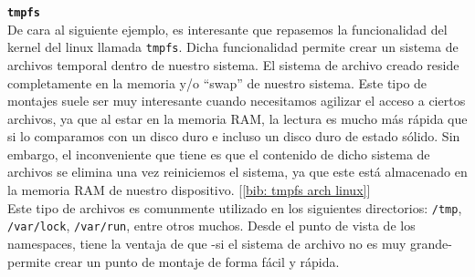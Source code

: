\documentclass[a4paper, oneside, 12pt]{book}
\begin{document}


	
	\pagebreak
	
	\noindent \textbf{\large \texttt{tmpfs}}\\
	
	\noindent De cara al siguiente ejemplo, es interesante que repasemos la funcionalidad del kernel del linux llamada \texttt{tmpfs}. Dicha funcionalidad permite crear un sistema de archivos temporal dentro de nuestro sistema. El sistema de archivo creado reside completamente en la memoria y/o ``swap'' de nuestro sistema. Este tipo de montajes suele ser muy interesante cuando necesitamos agilizar el acceso a ciertos archivos, ya que al estar en la memoria RAM, la lectura es mucho más rápida que si lo comparamos con un disco duro e incluso un disco duro de estado sólido. Sin embargo, el inconveniente que tiene es que el contenido de dicho sistema de archivos se elimina una vez reiniciemos el sistema, ya que este está almacenado en la memoria RAM de nuestro dispositivo. [\ref{bib: tmpfs arch linux}] \\
	
	\noindent Este tipo de archivos es comunmente utilizado en los siguientes directorios: \texttt{/tmp}, \texttt{/var/lock}, \texttt{/var/run}, entre otros muchos. Desde el punto de vista de los namespaces, tiene la ventaja de que -si el sistema de archivo no es muy grande- permite crear un punto de montaje de forma fácil y rápida. \\
	
\end{document}
